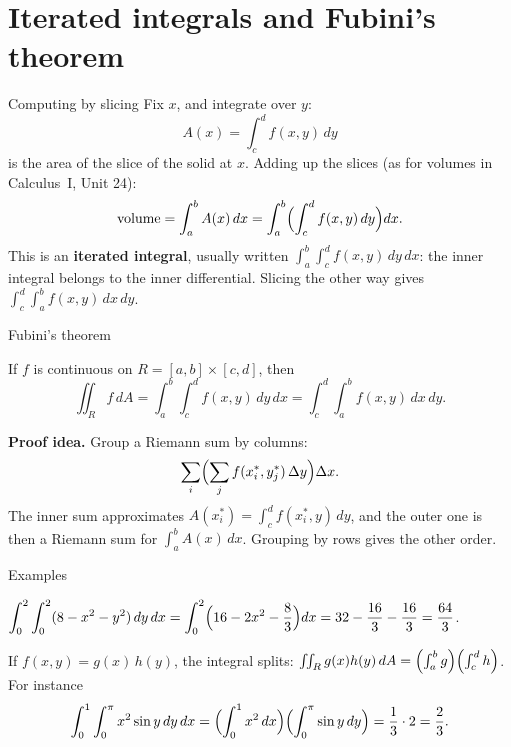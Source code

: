 \documentclass[10pt]{wosm-slides}
\newcommand{\dA}{\, dA}
\begin{document}
\section{Iterated integrals and Fubini's theorem}

\begin{frame}{Computing by slicing}
  Fix $x$, and integrate over $y$:
  \[ A(x) = \int_c^d f(x, y)\, dy \]
  is the area of the slice of the solid at $x$. Adding up the slices (as for volumes in
  Calculus~I, Unit 24):
  \[ \text{volume} = \int_a^b A(x)\, dx = \int_a^b \Bigl( \int_c^d f(x, y)\, dy \Bigr) dx . \]
  \pause
  This is an \textbf{iterated integral}, usually written $\int_a^b \int_c^d f(x, y)\, dy\, dx$: the
  inner integral belongs to the inner differential. Slicing the other way gives
  $\int_c^d \int_a^b f(x, y)\, dx\, dy$.
\end{frame}

\begin{frame}{Fubini's theorem}
  \begin{theorem}[Fubini]
    If $f$ is continuous on $R = [a, b] \times [c, d]$, then
    \[ \iint_R f \dA = \int_a^b \int_c^d f(x, y)\, dy\, dx = \int_c^d \int_a^b f(x, y)\, dx\, dy . \]
  \end{theorem}
  \pause
  \textbf{Proof idea.} Group a Riemann sum by columns:
  \[ \sum_i \Bigl( \sum_j f(x_i^*, y_j^*)\, \Delta y \Bigr) \Delta x . \]
  The inner sum approximates $A(x_i^*) = \int_c^d f(x_i^*, y)\, dy$, and the outer one is then a Riemann
  sum for $\int_a^b A(x)\, dx$. Grouping by rows gives the other order.
\end{frame}

\begin{frame}{Examples}
  \begin{example}
    $\displaystyle \int_0^2 \int_0^2 (8 - x^2 - y^2)\, dy\, dx = \int_0^2 \Bigl(16 - 2x^2 - \frac83\Bigr) dx
      = 32 - \frac{16}{3} - \frac{16}{3} = \frac{64}{3}$.
  \end{example}
  \pause
  \begin{example}[A product]
    If $f(x, y) = g(x)\, h(y)$, the integral splits:
    $\iint_R g(x) h(y) \dA = \Bigl(\int_a^b g\Bigr)\Bigl(\int_c^d h\Bigr)$. For instance
    \[ \int_0^1 \int_0^\pi x^2 \sin y\, dy\, dx = \Bigl(\int_0^1 x^2\, dx\Bigr) \Bigl(\int_0^\pi \sin y\, dy\Bigr)
       = \frac13 \cdot 2 = \frac23 . \]
  \end{example}
\end{frame}
\end{document}
